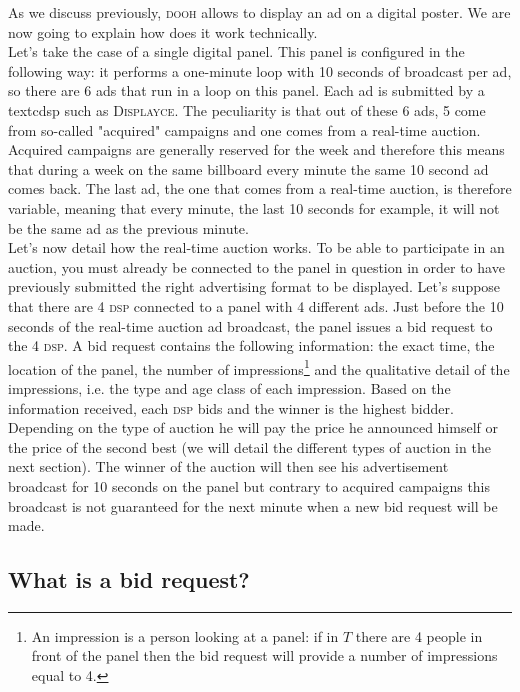 \documentclass[12pt]{article}
\newcommand{\disp}{\textsc{Displayce}\xspace}
\begin{document}
As we discuss previously, \textsc{dooh} allows to display an ad on a digital poster. We are now going to explain how does it work technically. \\
Let's take the case of a single digital panel. This panel is configured in the following way: it performs a one-minute loop with 10 seconds of broadcast per ad, so there are 6 ads that run in a loop on this panel. Each ad is submitted by a textc{dsp} such as \disp. The peculiarity is that out of these 6 ads, 5 come from so-called "acquired" campaigns and one comes from a real-time auction. Acquired campaigns are generally reserved for the week and therefore this means that during a week on the same billboard every minute the same 10 second ad comes back. The last ad, the one that comes from a real-time auction, is therefore variable, meaning that every minute, the last 10 seconds for example, it will not be the same ad as the previous minute. \\

Let's now detail how the real-time auction works. To be able to participate in an auction, you must already be connected to the panel in question in order to have previously submitted the right advertising format to be displayed. Let's suppose that there are 4 \textsc{dsp} connected to a panel with 4 different ads. Just before the 10 seconds of the real-time auction ad broadcast, the panel issues a bid request to the 4 \textsc{dsp}. A bid request contains the following information: the exact time, the location of the panel, the number of impressions\footnote{An impression is a person looking at a panel: if in $T$ there are 4 people in front of the panel then the bid request will provide a number of impressions equal to 4.} and the qualitative detail of the impressions, i.e. the type and age class of each impression. Based on the information received, each \textsc{dsp} bids and the winner is the highest bidder. Depending on the type of auction he will pay the price he announced himself or the price of the second best (we will detail the different types of auction in the next section). The winner of the auction will then see his advertisement broadcast for 10 seconds on the panel but contrary to acquired campaigns this broadcast is not guaranteed for the next minute when a new bid request will be made.  

\subsection{What is a bid request?}
\end{document}
